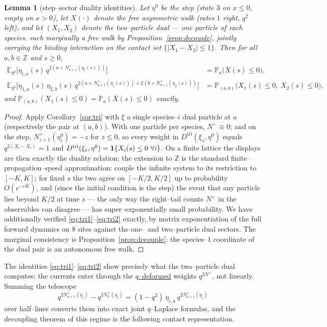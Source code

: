 \documentclass[11pt]{article}
\theoremstyle{plain}
\newtheorem{lemma}[theorem]{Lemma}
\theoremstyle{definition}
\theoremstyle{remark}
\newcommand{\Z}{\mathbb{Z}}\newcommand{\R}{\mathbb{R}}\newcommand{\N}{\mathbb{N}}
\newcommand{\E}{\mathbb{E}}\newcommand{\PP}{\mathbb{P}}\newcommand{\dd}{\,\mathrm{d}}
\begin{document}
\begin{lemma}[step--sector duality identities]\label{lem:tridual}
Let $\eta^0$ be the step (state $3$ on $x\le0$, empty on $x>0$), let $X(\cdot)$ denote
the free asymmetric walk (rates $1$ right, $q^2$ left), and let $(X_1,X_2)$ denote the
two--particle dual --- one particle of each species, each marginally a free walk by
Proposition~\ref{prop:decouple}, jointly carrying the binding interaction on the
contact set $\{|X_1-X_2|\le1\}$. Then for all $a,b\in\Z$ and $s\ge0$,
\begin{align}
  \E_{\eta^0}\Big[\eta_{i,a}(s)\,q^{2\left(a+N^+_{a+1}(\eta_i(s))\right)}\Big]
   &=\PP_a\big(X(s)\le0\big),\label{eq:tri1}\\
  \E_{\eta^0}\Big[\eta_{1,a}(s)\,\eta_{2,b}(s)\,
    q^{2\left(a+N^+_{a+1}(\eta_1(s))\right)+2\left(b+N^+_{b+1}(\eta_2(s))\right)}\Big]
   &=\PP_{(a,b)}\big(X_1(s)\le0,\ X_2(s)\le0\big),\label{eq:tri2}
\end{align}
and $\PP_{(a,b)}(X_1(s)\le0)=\PP_a(X(s)\le0)$ exactly.
\end{lemma}
\begin{proof}
Apply Corollary~\ref{cor:tri} with $\xi$ a single species--$i$ dual particle at $a$
(respectively the pair at $(a,b)$). With one particle per species, $N^-\equiv0$; and
on the step, $N^+_{z+1}(\eta^0_i)=-z$ for $z\le0$, so every weight in
$D^{\mathrm{tri}}(\xi_s,\eta^0)$ equals $q^{2(X_i-X_i)}=1$ and
$D^{\mathrm{tri}}(\xi_s,\eta^0)=\bone\{X_i(s)\le0\ \forall i\}$. On a finite lattice
the displays are then exactly the duality relation; the extension to $\Z$ is the
standard finite--propagation--speed approximation: couple the infinite system to its
restriction to $[-K,K]$; for fixed $s$ the two agree on $[-K/2,K/2]$ up to
probability $O(e^{-cK})$, and (since the initial condition is the step) the event
that any particle lies beyond $K/2$ at time $s$ --- the only way the right--tail
counts $N^+$ in the observables can disagree --- has super--exponentially small
probability. We
have additionally verified \eqref{eq:tri1}--\eqref{eq:tri2} exactly, by matrix
exponentiation of the full forward dynamics on $8$ sites against the one-- and
two--particle dual sectors. The marginal consistency is
Proposition~\ref{prop:decouple}: the species--$1$ coordinate of the dual pair is an
autonomous free walk.
\end{proof}

The identities \eqref{eq:tri1}--\eqref{eq:tri2} show precisely what the two--particle
dual computes: the currents enter through the \underline{$q$--deformed} weights
$q^{2N^+}$, not linearly. Summing the telescope
\begin{equation}\label{eq:telescope}
  q^{2N^+_{a+1}(\eta_i)}-q^{2N^+_{a}(\eta_i)}
  =(1-q^2)\,\eta_{i,a}\,q^{2N^+_{a+1}(\eta_i)}
\end{equation}
over half--lines converts them into exact joint $q$--Laplace formulas, and the
decoupling theorem of this regime is the following contact representation.
\end{document}
